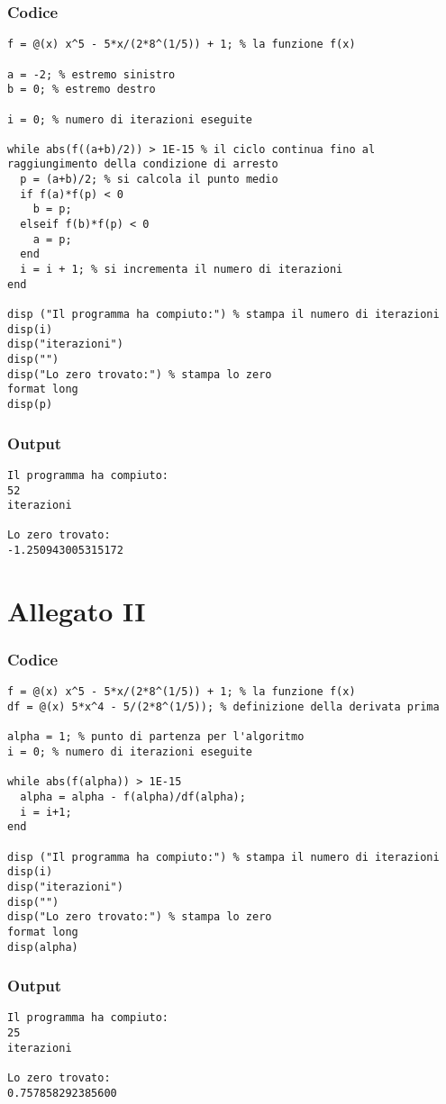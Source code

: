 \subsection*{Codice}
\begin{lstlisting}
f = @(x) x^5 - 5*x/(2*8^(1/5)) + 1; % la funzione f(x)

a = -2; % estremo sinistro
b = 0; % estremo destro 

i = 0; % numero di iterazioni eseguite

while abs(f((a+b)/2)) > 1E-15 % il ciclo continua fino al raggiungimento della condizione di arresto 
  p = (a+b)/2; % si calcola il punto medio
  if f(a)*f(p) < 0
    b = p;
  elseif f(b)*f(p) < 0
    a = p;
  end
  i = i + 1; % si incrementa il numero di iterazioni
end

disp ("Il programma ha compiuto:") % stampa il numero di iterazioni
disp(i)
disp("iterazioni")
disp("")
disp("Lo zero trovato:") % stampa lo zero
format long
disp(p)
\end{lstlisting}

\subsection*{Output}
\begin{lstlisting}
Il programma ha compiuto:
52
iterazioni

Lo zero trovato:
-1.250943005315172
\end{lstlisting}
\vfill

\chapter{Allegato II}\label{all:2}

\subsection*{Codice}
\begin{lstlisting}
f = @(x) x^5 - 5*x/(2*8^(1/5)) + 1; % la funzione f(x)
df = @(x) 5*x^4 - 5/(2*8^(1/5)); % definizione della derivata prima

alpha = 1; % punto di partenza per l'algoritmo
i = 0; % numero di iterazioni eseguite

while abs(f(alpha)) > 1E-15
  alpha = alpha - f(alpha)/df(alpha);
  i = i+1;
end

disp ("Il programma ha compiuto:") % stampa il numero di iterazioni
disp(i)
disp("iterazioni")
disp("")
disp("Lo zero trovato:") % stampa lo zero
format long
disp(alpha)
\end{lstlisting}

\subsection*{Output}
\begin{lstlisting}
Il programma ha compiuto:
25
iterazioni

Lo zero trovato:
0.757858292385600
\end{lstlisting}
\vfill

\cleardoublepage
\printbibliography{}\thispagestyle{fancy}